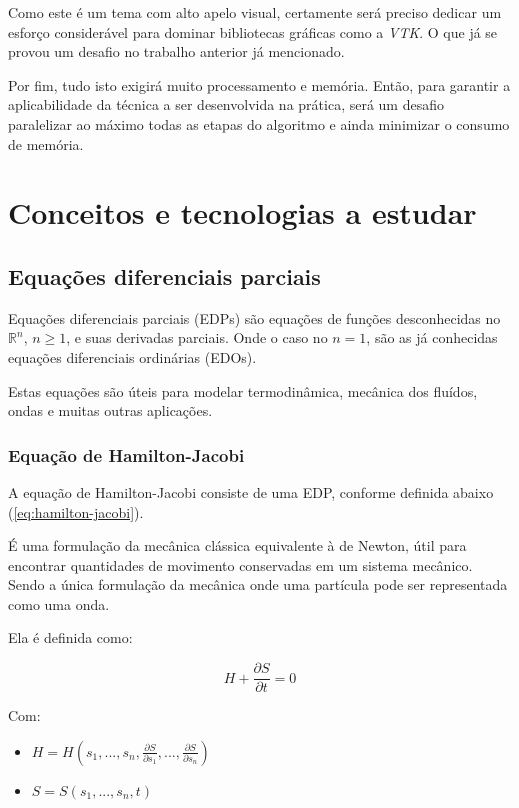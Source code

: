 \documentclass[a4paper,11pt]{report}
\begin{document}
  Como este é um tema com alto apelo visual, certamente será preciso dedicar um esforço considerável para dominar bibliotecas gráficas como a \textit{VTK}. O que já se provou um desafio no trabalho anterior já mencionado.
  
  Por fim, tudo isto exigirá muito processamento e memória. Então, para garantir a aplicabilidade da técnica a ser desenvolvida na prática, será um desafio paralelizar ao máximo todas as etapas do algoritmo e ainda minimizar o consumo de memória.
  
\chapter{Conceitos e tecnologias a estudar}
  \section{Equações diferenciais parciais}
    Equações diferenciais parciais (EDPs) são equações de funções desconhecidas no $\mathbb{R}^{n}$, $n \geq 1$, e suas derivadas parciais. Onde o caso no $n = 1$, são as já conhecidas equações diferenciais ordinárias (EDOs).
    
    Estas equações são úteis para modelar termodinâmica, mecânica dos fluídos, ondas e muitas outras aplicações.
  
    \subsection{Equação de Hamilton-Jacobi}
    A equação de Hamilton-Jacobi consiste de uma EDP, conforme definida abaixo (\ref{eq:hamilton-jacobi}).

    É uma formulação da mecânica clássica equivalente à de Newton, útil para encontrar quantidades de movimento conservadas em um sistema mecânico. Sendo a única formulação da mecânica onde uma partícula pode ser representada como uma onda.
    
    Ela é definida como: 

    \begin{equation} \label{eq:hamilton-jacobi}
      H + \frac{\partial S}{\partial t} = 0
    \end{equation}
    
    Com:
    
    \begin{itemize}
      \item $H = H(s_{1}, ..., s_{n}, \frac{\partial S}{\partial s_{1}}, ..., \frac{\partial S}{\partial s_{n}})$
      \item $S = S(s_{1}, ..., s_{n}, t)$
    \end{itemize}
    
\end{document}
